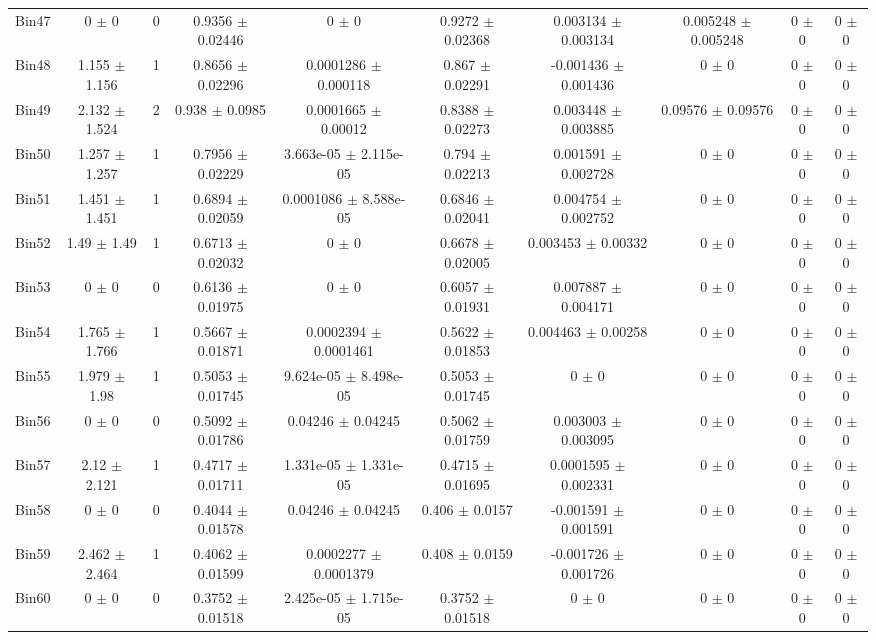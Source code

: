\begin{tabular}{@{\extracolsep{4pt}}lccccccccc@{}}
     Bin47 & 0 $\pm$ 0 & 0 & 0.9356 $\pm$ 0.02446 & 0 $\pm$ 0 & 0.9272 $\pm$ 0.02368 & 0.003134 $\pm$ 0.003134 & 0.005248 $\pm$ 0.005248 & 0 $\pm$ 0 & 0 $\pm$ 0 \\ 
     Bin48 & 1.155 $\pm$ 1.156 & 1 & 0.8656 $\pm$ 0.02296 & 0.0001286 $\pm$ 0.000118 & 0.867 $\pm$ 0.02291 & -0.001436 $\pm$ 0.001436 & 0 $\pm$ 0 & 0 $\pm$ 0 & 0 $\pm$ 0 \\ 
     Bin49 & 2.132 $\pm$ 1.524 & 2 & 0.938 $\pm$ 0.0985 & 0.0001665 $\pm$ 0.00012 & 0.8388 $\pm$ 0.02273 & 0.003448 $\pm$ 0.003885 & 0.09576 $\pm$ 0.09576 & 0 $\pm$ 0 & 0 $\pm$ 0 \\ 
     Bin50 & 1.257 $\pm$ 1.257 & 1 & 0.7956 $\pm$ 0.02229 & 3.663e-05 $\pm$ 2.115e-05 & 0.794 $\pm$ 0.02213 & 0.001591 $\pm$ 0.002728 & 0 $\pm$ 0 & 0 $\pm$ 0 & 0 $\pm$ 0 \\ 
     Bin51 & 1.451 $\pm$ 1.451 & 1 & 0.6894 $\pm$ 0.02059 & 0.0001086 $\pm$ 8.588e-05 & 0.6846 $\pm$ 0.02041 & 0.004754 $\pm$ 0.002752 & 0 $\pm$ 0 & 0 $\pm$ 0 & 0 $\pm$ 0 \\ 
     Bin52 & 1.49 $\pm$ 1.49 & 1 & 0.6713 $\pm$ 0.02032 & 0 $\pm$ 0 & 0.6678 $\pm$ 0.02005 & 0.003453 $\pm$ 0.00332 & 0 $\pm$ 0 & 0 $\pm$ 0 & 0 $\pm$ 0 \\ 
     Bin53 & 0 $\pm$ 0 & 0 & 0.6136 $\pm$ 0.01975 & 0 $\pm$ 0 & 0.6057 $\pm$ 0.01931 & 0.007887 $\pm$ 0.004171 & 0 $\pm$ 0 & 0 $\pm$ 0 & 0 $\pm$ 0 \\ 
     Bin54 & 1.765 $\pm$ 1.766 & 1 & 0.5667 $\pm$ 0.01871 & 0.0002394 $\pm$ 0.0001461 & 0.5622 $\pm$ 0.01853 & 0.004463 $\pm$ 0.00258 & 0 $\pm$ 0 & 0 $\pm$ 0 & 0 $\pm$ 0 \\ 
     Bin55 & 1.979 $\pm$ 1.98 & 1 & 0.5053 $\pm$ 0.01745 & 9.624e-05 $\pm$ 8.498e-05 & 0.5053 $\pm$ 0.01745 & 0 $\pm$ 0 & 0 $\pm$ 0 & 0 $\pm$ 0 & 0 $\pm$ 0 \\ 
     Bin56 & 0 $\pm$ 0 & 0 & 0.5092 $\pm$ 0.01786 & 0.04246 $\pm$ 0.04245 & 0.5062 $\pm$ 0.01759 & 0.003003 $\pm$ 0.003095 & 0 $\pm$ 0 & 0 $\pm$ 0 & 0 $\pm$ 0 \\ 
     Bin57 & 2.12 $\pm$ 2.121 & 1 & 0.4717 $\pm$ 0.01711 & 1.331e-05 $\pm$ 1.331e-05 & 0.4715 $\pm$ 0.01695 & 0.0001595 $\pm$ 0.002331 & 0 $\pm$ 0 & 0 $\pm$ 0 & 0 $\pm$ 0 \\ 
     Bin58 & 0 $\pm$ 0 & 0 & 0.4044 $\pm$ 0.01578 & 0.04246 $\pm$ 0.04245 & 0.406 $\pm$ 0.0157 & -0.001591 $\pm$ 0.001591 & 0 $\pm$ 0 & 0 $\pm$ 0 & 0 $\pm$ 0 \\ 
     Bin59 & 2.462 $\pm$ 2.464 & 1 & 0.4062 $\pm$ 0.01599 & 0.0002277 $\pm$ 0.0001379 & 0.408 $\pm$ 0.0159 & -0.001726 $\pm$ 0.001726 & 0 $\pm$ 0 & 0 $\pm$ 0 & 0 $\pm$ 0 \\ 
     Bin60 & 0 $\pm$ 0 & 0 & 0.3752 $\pm$ 0.01518 & 2.425e-05 $\pm$ 1.715e-05 & 0.3752 $\pm$ 0.01518 & 0 $\pm$ 0 & 0 $\pm$ 0 & 0 $\pm$ 0 & 0 $\pm$ 0 \\ 
\hline\hline
  \end{tabular}
